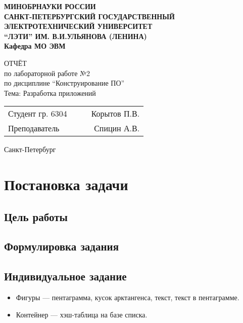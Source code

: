 \documentclass[a4paper, 14pt]{extarticle}
\begin{document}
\begin{titlepage}
    \centering
    {\bfseries
        \uppercase{
            Минобрнауки России \\
            Санкт-Петербургский государственный \\
            Электротехнический университет \\
            \enquote{ЛЭТИ} им. В.И.Ульянова (Ленина)\\
        }
        Кафедра МО ЭВМ

        \vspace{\fill}
        \uppercase{Отчёт} \\
        по лабораторной работе №2 \\
        по дисциплине \enquote{Конструирование ПО} \\
        Тема: Разработка приложений
    }

    \vspace{\fill}
    \begin{tabularx}{0.8\textwidth}{l X c r}
        Студент гр. 6304 & & \underline{\hspace{3cm}} & Корытов П.В.\\
        Преподаватель & & \underline{\hspace{3cm}} & Спицин А.В.
    \end{tabularx}

    \vspace{1cm}
    Санкт-Петербург \\
    \the\year{}
\end{titlepage}

\tableofcontents{}
\newpage

\section{Постановка задачи}
\subsection{Цель работы}
\lipsum[1] %

\subsection{Формулировка задания}
\lipsum[1] %

\subsection{Индивидуальное задание}
\begin{itemize}
    \item Фигуры --- пентаграмма, кусок арктангенса, текст, текст в пентаграмме.
    \item Контейнер --- хэш-таблица на базе списка.
\end{itemize}
\end{document}
